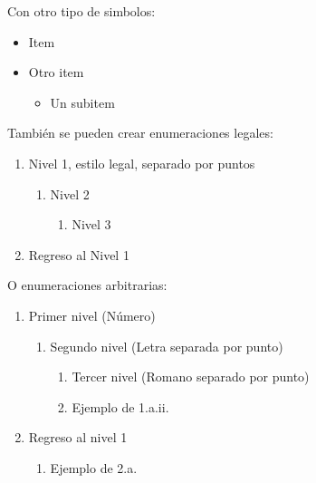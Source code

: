 Con otro tipo de simbolos:

\begin{itemize}[label=$\Rightarrow$]
    \item Item 
    \item Otro item
        \begin{itemize}[label=$\blacktriangleright$]
            \item Un subitem
        \end{itemize}
\end{itemize}

También se pueden crear enumeraciones legales:

\begin{enumerate}[label=\arabic*.]
    \item Nivel 1, estilo legal, separado por puntos
    \begin{enumerate}[label=\theenumi\arabic*.]
        \item Nivel 2
        \begin{enumerate}[label=\theenumii\arabic*.]
            \item Nivel 3
        \end{enumerate}
    \end{enumerate}
    \item Regreso al Nivel 1
\end{enumerate}

O enumeraciones arbitrarias:

\begin{enumerate}[label=\arabic*.]
    \item Primer nivel (Número)
    \begin{enumerate}[label=\theenumi\alph*.]
        \item Segundo nivel (Letra separada por punto)
        \begin{enumerate}[label=\theenumii\roman*.]
            \item Tercer nivel (Romano separado por punto)
            \item Ejemplo de 1.a.ii.
        \end{enumerate}
    \end{enumerate}
    \item Regreso al nivel 1
    \begin{enumerate}[label=\theenumi\alph*.]
        \item Ejemplo de 2.a.
    \end{enumerate}
\end{enumerate}

